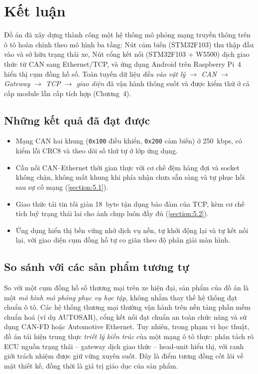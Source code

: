 \documentclass[../DoAn.tex]{subfiles}
\begin{document}
\section{Kết luận}
\label{section:6.1}

Đồ án đã xây dựng thành công một hệ thống mô phỏng mạng truyền thông trên ô tô
hoàn chỉnh theo mô hình ba tầng: Nút cảm biến (STM32F103) thu thập đầu vào và sở
hữu trạng thái xe, Nút cổng kết nối (STM32F103 + W5500) dịch giao thức từ CAN
sang Ethernet/TCP, và ứng dụng Android trên Raspberry Pi~4 hiển thị cụm đồng hồ
số. Toàn tuyến dữ liệu \textit{đầu vào vật lý $\to$ CAN $\to$ Gateway $\to$ TCP
$\to$ giao diện} đã vận hành thông suốt và được kiểm thử ở cả cấp module lẫn cấp
tích hợp (Chương~4).

\subsection*{Những kết quả đã đạt được}
\begin{itemize}
  \item Mạng CAN hai khung (\texttt{0x100} điều khiển, \texttt{0x200} cảm biến)
    ở 250~kbps, có kiểm lỗi CRC8 và theo dõi số thứ tự ở lớp ứng dụng.
  \item Cầu nối CAN--Ethernet thời gian thực với cơ chế đệm hàng đợi và socket
    không chặn, không mất khung khi phía nhận chưa sẵn sàng và tự phục hồi sau sự
    cố mạng (\ref{section:5.1}).
  \item Giao thức tải tin tối giản 18~byte tận dụng bảo đảm của TCP, kèm cơ chế
    tích luỹ trạng thái lai cho ảnh chụp luôn đầy đủ (\ref{section:5.2}).
  \item Ứng dụng hiển thị bền vững nhờ dịch vụ nền, tự khởi động lại và tự kết nối
    lại, với giao diện cụm đồng hồ tự co giãn theo độ phân giải màn hình.
\end{itemize}

\subsection*{So sánh với các sản phẩm tương tự}
So với một cụm đồng hồ số thương mại trên xe hiện đại, sản phẩm của đồ án là một
\emph{mô hình mô phỏng phục vụ học tập}, không nhằm thay thế hệ thống đạt chuẩn ô
tô. Các hệ thống thương mại thường vận hành trên nền tảng phần mềm chuẩn hoá
(ví dụ AUTOSAR), cổng kết nối đạt chuẩn an toàn chức năng và sử dụng CAN-FD hoặc
Automotive Ethernet. Tuy nhiên, trong phạm vi học thuật, đồ án tái hiện trung
thực \emph{triết lý kiến trúc} của một mạng ô tô thực: phân tách rõ ECU nguồn
trạng thái -- gateway dịch giao thức -- head-unit hiển thị, với ranh giới trách
nhiệm được giữ vững xuyên suốt. Đây là điểm tương đồng cốt lõi về mặt thiết kế,
đồng thời là giá trị giáo dục của sản phẩm.
\end{document}
